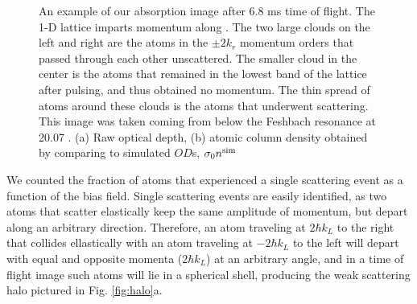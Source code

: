 \documentclass[12pt]{iopart}
\begin{document}
\begin{figure}
\caption{An example of our absorption image after 6.8 ms time of flight. The 1-D lattice imparts momentum along \ex{}. The two large clouds on the left and right are the atoms in the $\pm 2k_r$ momentum orders that passed through each other unscattered. The smaller cloud in the center is the atoms that remained in the lowest band of the lattice after pulsing, and thus obtained no momentum. The thin spread of atoms around these clouds is the atoms that underwent scattering.   This image was taken coming from below the Feshbach resonance at 20.07  \mT{}. (a) Raw optical depth, (b) atomic column density obtained by comparing to simulated $OD$s, $\sigma_0 n^{\rm{sim}}$ }  
\label{fig:SampleCorrection}
\end{figure}
\par We counted the fraction of atoms that experienced a single scattering event as a function of the bias field. Single scattering events are easily identified, as two atoms that scatter elastically keep the same amplitude of momentum, but depart along an arbitrary direction. Therefore, an atom traveling at $2 \hbar k_L$ to the right that collides ellastically with an atom traveling at $-2 \hbar k_L$ to the left will depart with equal and opposite momenta ($2 \hbar k_L$) at an arbitrary angle, and in a time of flight image such atoms will lie in a spherical shell, producing the weak scattering halo pictured in Fig. \ref{fig:halo}a. 
\end{document}
